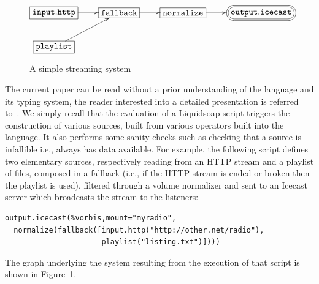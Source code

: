 \documentclass{llncs}
\newcommand{\liquidsoap}{Liquidsoap}
\newcommand{\ie}{{i.e.},}
\newcommand{\TODO}[1]{\marginpar{\tiny #1}}
\begin{document}
\begin{figure}[t]
 \begin{center}
\[
\xymatrix{
  *+[F]{\mathtt{input.http}}\ar[r]&*+[F]{\mathtt{fallback}}\ar[r]&
  *+[F]{\mathtt{normalize}}\ar[r]&
  *+<10pt>[F=:<30pt>]{\mathtt{output.icecast}}\\
  *+[F]{\mathtt{playlist}}\ar[ur]&\\
}
\]
\end{center}
 \caption{A simple streaming system}
 \label{fig:simple}
\end{figure}

The current paper can be read without a prior understanding of the language and
its typing system, the reader interested into a detailed presentation is referred
to~\cite{baelde-mimram:webradio-lambda}. We simply recall that the evaluation of
a \liquidsoap{} script triggers the construction of various sources, built from
various operators built into the language. It also performs some sanity checks
such as checking that a source is infallible \ie{} always has data available. 
For example, the following script defines two elementary sources, respectively 
reading from an HTTP stream and a playlist of files, composed in a fallback 
(\ie{} if the HTTP stream is ended or broken then the playlist is used), 
filtered through a volume normalizer and sent to an Icecast server which 
broadcasts the stream to the listeners:%
\begin{verbatim}
output.icecast(%vorbis,mount="myradio",
  normalize(fallback([input.http("http://other.net/radio"),
                      playlist("listing.txt")])))
\end{verbatim}
The graph underlying the system resulting from the execution of that
script is shown in Figure~\ref{fig:simple}.\TODO{mount est un exemple de label}

% 
% 
\end{document}
